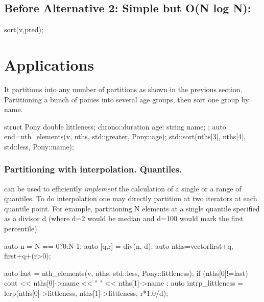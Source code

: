 \subsection*{Before \textnormal{Alternative 2: Simple but O(N log N):}}
\begin{codeblock}
sort(v,pred);
\end{codeblock}

\newpage
\section{Applications}

It partitions into any number of partitions as shown in the previous section. Partitioning a bunch of ponies into several age groups, then sort one group by name.

\begin{codeblock}
struct Pony{
  double littleness; 
  chrono::duration age;
  string name;
};
auto end=nth_elements(v, nths, std::greater{}, Pony::age);
std::sort(nths[3], nths[4], std::less{}, Pony::name);
\end{codeblock}

\subsubsection*{Partitioning with interpolation. Quantiles.}


 can be used to efficiently \emph{implement} the calculation of a single or a range of quantiles.
To do interpolation one may directly partition at two iterators at each quantile point. For example, partitioning N elements at a single quantile specified as a divisor d (where d=2 would be median and d=100 would mark the first percentile).
\begin{codeblock}
auto n = N == 0?0:N-1;
auto [q,r] = div(n, d);
auto nths=vector{first+q, first+q+(r>0)}; 
\end{codeblock}

\begin{codeblock}
auto last = nth_elements(v, nths, std::less{}, Pony::littleness);
if (nths[0]!=last){
  cout << nths[0]->name << " " << nths[1]->name ; 
  auto intrp_littleness = lerp(nths[0]->littleness, nths[1]->littleness, r*1.0/d);
}
\end{codeblock}

